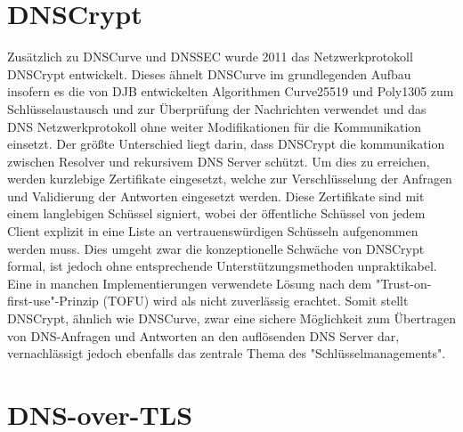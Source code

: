 
\section{DNSCrypt}

Zusätzlich zu DNSCurve und DNSSEC wurde 2011 das Netzwerkprotokoll DNSCrypt entwickelt. Dieses ähnelt DNSCurve im grundlegenden Aufbau insofern es die von DJB entwickelten Algorithmen Curve25519 und Poly1305 zum Schlüsselaustausch und zur Überprüfung der Nachrichten verwendet und das DNS Netzwerkprotokoll ohne weiter Modifikationen für die Kommunikation einsetzt. Der größte Unterschied liegt darin, dass DNSCrypt die kommunikation zwischen Resolver und rekursivem DNS Server schützt. Um dies zu erreichen, werden kurzlebige Zertifikate eingesetzt, welche zur Verschlüsselung der Anfragen und Validierung der Antworten eingesetzt werden. Diese Zertifikate sind mit einem langlebigen Schüssel signiert, wobei der öffentliche Schüssel von jedem Client explizit in eine Liste an vertrauenswürdigen Schüsseln aufgenommen werden muss.\cite{Denis2016} Dies umgeht zwar die konzeptionelle Schwäche von DNSCrypt formal, ist jedoch ohne entsprechende Unterstützungsmethoden unpraktikabel. Eine in manchen Implementierungen verwendete Lösung nach dem "Trust-on-first-use"-Prinzip (TOFU) wird als nicht zuverlässig erachtet.\cite{Wendlandt2008} Somit stellt DNSCrypt, ähnlich wie DNSCurve, zwar eine sichere  Möglichkeit zum Übertragen von DNS-Anfragen und Antworten an den auflösenden DNS Server dar, vernachlässigt jedoch ebenfalls das zentrale Thema des "Schlüsselmanagements".    

\section{DNS-over-TLS}

